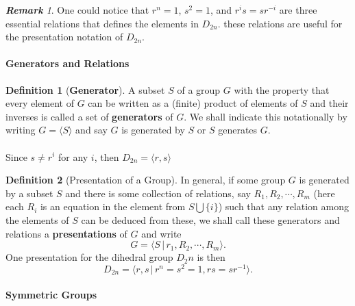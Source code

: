 \documentclass[paper=a4, fontsize=11pt]{scrartcl}
\numberwithin{equation}{section}		%
\numberwithin{figure}{section}			%
\numberwithin{table}{section}				%
\theoremstyle{definition}
\newtheorem{definition}{Definition}[section]
\theoremstyle{remark}
\newtheorem*{remark}{\textbf{Remark}}
\theoremstyle{example}
\begin{document}
\begin{remark}
    One could notice that $r^n = 1$, $s^2 = 1$, and $r^is = sr^{-i}$ are three essential relations that defines the elements in $D_{2n}$. these relations are useful for the presentation notation of $D_{2n}$.
\end{remark}

\paragraph{Generators and Relations}

\begin{definition}[\textbf{Generator}]
    A subset $S$ of a group $G$ with the property that every element of $G$ can be written as a (finite) product of elements of $S$ and their inverses is called a set of \textbf{generators} of $G$. We shall indicate this notationally by writing $G = \langle S \rangle$ and say $G$ is generated by $S$ or $S$ generates $G$.
\end{definition}

\paragraph{}

Since $s \neq r^i$ for any $i$, then $D_{2n} = \langle r, s \rangle$

\begin{definition}[Presentation of a Group]
    In general, if some group $G$ is generated by a subset $S$ and there is some collection of relations, say $R_1,R_2, \cdots, R_m$ (here each $R_i$ is an equation in the element from $S \bigcup \{i\}$) such that any relation among the elements of $S$ can be deduced from these, we shall call these generators and relations a \textbf{presentations} of $G$ and write
    \begin{equation}
        G = \langle S \,\lvert\, r_1,R_2,\cdots,R_m \rangle.
    \end{equation}
    One presentation for the dihedral group $D_2n$ is then
    \begin{equation}
        D_{2n} = \langle r,s \,\lvert\, r^n = s^2 = 1, rs = sr^{-1} \rangle.
    \end{equation}
\end{definition}

\paragraph{Symmetric Groups}
\end{document}
